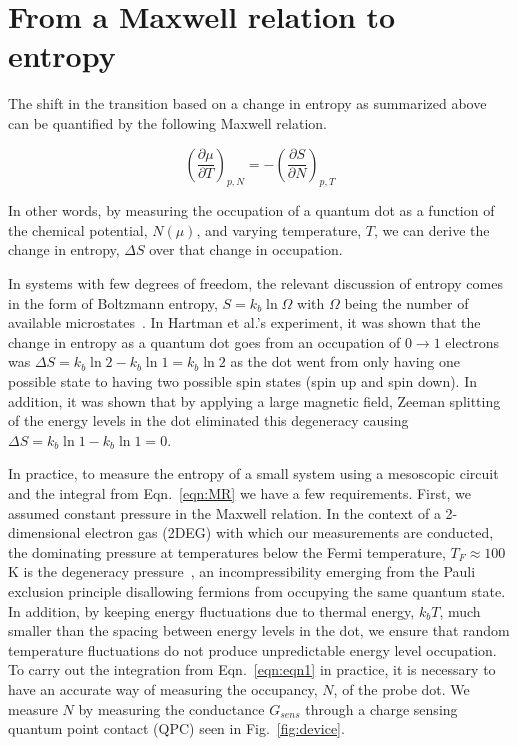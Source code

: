 \section{From a Maxwell relation to entropy}
\label{sec:mrtoentropy}

The shift in the transition based on a change in entropy as summarized above can be quantified by the following Maxwell relation.

\begin{equation}
	\label{eqn:MR}
	\left( \frac{\partial \mu }{\partial T} \right)_{p,N} = -\left( \frac{\partial S}{\partial N} \right)_{p,T}
\end{equation}


In other words, by measuring the occupation of a quantum dot as a function of the chemical potential, $N(\mu)$, and varying temperature, $T$, we can derive the change in entropy, $\Delta S$ over that change in occupation.

In systems with few degrees of freedom, the relevant discussion of entropy comes in the form of Boltzmann entropy, $S = k_b \ln \Omega$ with $\Omega$ being the number of available microstates~\cite{schroeder}. In Hartman et al.'s experiment, it was shown that the change in entropy as a quantum dot goes from an occupation of $0 \to 1$ electrons was $\Delta S = k_b \ln 2 - k_b \ln 1 = k_b \ln 2$ as the dot went from only having one possible state to having two possible spin states (spin up and spin down). In addition, it was shown that by applying a large magnetic field, Zeeman splitting of the energy levels in the dot eliminated this degeneracy causing $\Delta S = k_b \ln 1 - k_b \ln 1 = 0$.

In practice, to measure the entropy of a small system using a mesoscopic circuit and the integral from Eqn.~\ref{eqn:MR} we have a few requirements. First, we assumed constant pressure in the Maxwell relation. In the context of a 2-dimensional electron gas (2DEG) with which our measurements are conducted, the dominating pressure at temperatures below the Fermi temperature, $T_F \approx 100$K is the degeneracy pressure~\cite{ashcroftmermin}, an incompressibility emerging from the Pauli exclusion principle disallowing fermions from occupying the same quantum state. In addition, by keeping energy fluctuations due to thermal energy, $k_bT$, much smaller than the spacing between energy levels in the dot, we ensure that random temperature fluctuations do not produce unpredictable energy level occupation.
To carry out the integration from Eqn.~\ref{eqn:eqn1} in practice, it is necessary to have an accurate way of measuring the occupancy, $N$, of the probe dot. We measure $N$ by measuring the conductance $G_{sens}$ through a charge sensing quantum point contact (QPC) seen in Fig.~\ref{fig:device}. 

